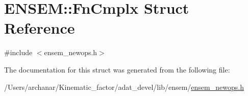 \hypertarget{structENSEM_1_1FnCmplx}{}\section{E\+N\+S\+EM\+:\+:Fn\+Cmplx Struct Reference}
\label{structENSEM_1_1FnCmplx}


{\ttfamily \#include $<$ensem\+\_\+newops.\+h$>$}



The documentation for this struct was generated from the following file\+:\begin{DoxyCompactItemize}
\item 
/\+Users/archanar/\+Kinematic\+\_\+factor/adat\+\_\+devel/lib/ensem/\mbox{\hyperlink{lib_2ensem_2ensem__newops_8h}{ensem\+\_\+newops.\+h}}\end{DoxyCompactItemize}
